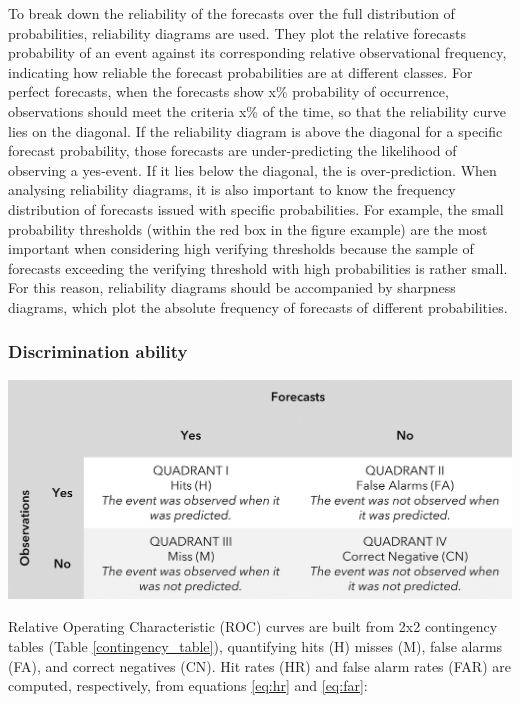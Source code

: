 To break down the reliability of the forecasts over the full distribution of probabilities, reliability diagrams are used. They plot the relative forecasts probability of an event against its corresponding relative observational frequency, indicating how reliable the forecast probabilities are at different classes. For perfect forecasts, when the forecasts show x\% probability of occurrence, observations should meet the criteria x\% of the time, so that the reliability curve lies on the diagonal. If the reliability diagram is above the diagonal for a specific forecast probability, those forecasts are under-predicting the likelihood of observing a yes-event. If it lies below the diagonal, the is over-prediction. When analysing reliability diagrams, it is also important to know the frequency distribution of forecasts issued with specific probabilities. For example, the small probability thresholds (within the red box in the figure example) are the most important when considering high verifying thresholds because the sample of forecasts exceeding the verifying threshold with high probabilities is rather small. For this reason, reliability diagrams should be accompanied by sharpness diagrams, which plot the absolute frequency of forecasts of different probabilities. 


\subsubsection{Discrimination ability}

\begin{table}[htbp]
\centering
{}
\includegraphics[width=\textwidth]{contingency_table.png}
\label{table:contingency_table}
\end{table}

Relative Operating Characteristic (ROC) curves are built from 2x2 contingency tables (Table \ref{contingency_table}), quantifying hits (H) misses (M), false alarms (FA), and correct negatives (CN). Hit rates (HR) and false alarm rates (FAR) are computed, respectively, from equations \ref{eq:hr} and \ref{eq:far}:

